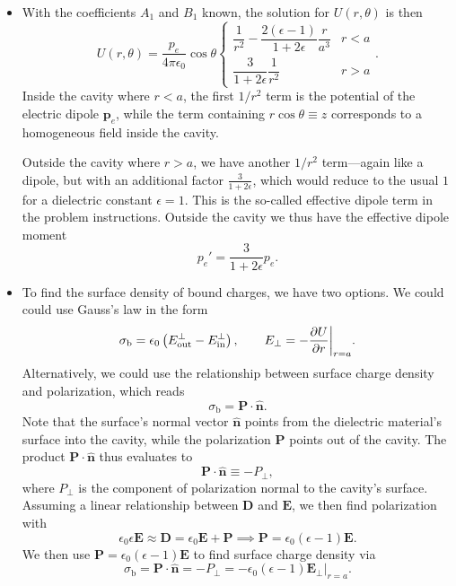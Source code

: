 \documentclass[11pt, a4paper]{article}
\renewcommand{\vec}[1]{\bm{#1}} %
\newcommand{\uvec}[1]{\hat{\vec{#1}}} %
\newcommand{\E}{\vec{E}}  %
\newcommand{\D}{\vec{D}}  %
\newcommand{\e}{\epsilon}
\newcommand{\ee}{\epsilon_{0}}  %
\newcommand{\pe}{\vec{p}_{e}}  %
\renewcommand{\P}{\vec{P}}  %
\begin{document}
\begin{itemize}
	\item With the coefficients $ A_{1} $ and $ B_{1} $ known, the solution for $ U(r, \theta) $ is then
	\begin{equation*}
		U(r, \theta) = \frac{p_{e}}{4\pi \ee}\cos \theta
		\begin{cases}
			\dfrac{1}{r^{2}} - \dfrac{2(\e - 1)}{1 + 2\e}\dfrac{r}{a^{3}} & r < a\\[2mm]
			\dfrac{3}{1 + 2\e} \dfrac{1}{r^{2}} & r > a
		\end{cases}.
	\end{equation*}
	Inside the cavity where $ r < a $, the first $ 1/r^{2} $ term is the potential of the electric dipole $ \pe $, while the term containing $  r \cos \theta \equiv z $ corresponds to a homogeneous field inside the cavity. 
	
	Outside the cavity where $ r > a $, we have another $ 1/r^{2} $ term---again like a dipole, but with an additional factor $ \frac{3}{1 + 2\e} $, which would reduce to the usual $ 1 $ for a dielectric constant $ \e = 1 $. This is the so-called effective dipole term in the problem instructions. Outside the cavity we thus have the effective dipole moment
	\begin{equation*}
		p_{e}' = \frac{3}{1 + 2\e}p_{e}.
	\end{equation*}
	
	\item To find the surface density of bound charges, we have two options. We could could use Gauss's law in the form
	\begin{equation*}
		\sigma_{\mathrm{b}} = \ee \left(E^{\mathrm{\perp}}_{\text{out}} - E^{\mathrm{\perp}}_{\text{in}}\right), \qquad E_{\perp} = -\pdv{U}{r} \bigg |_{r = a}.
	\end{equation*}
	Alternatively, we could use the relationship between surface charge density and polarization, which reads
	\begin{equation*}
		\sigma_{\mathrm{b}} = \P \cdot \uvec{n}.
	\end{equation*}
	Note that the surface's normal vector $ \uvec{n} $ points from the dielectric material's surface into the cavity, while the polarization $ \P $ points out of the cavity. The product $  \P \cdot \uvec{n} $ thus evaluates to
	\begin{equation*}
		 \P \cdot \uvec{n} \equiv - P_{\perp},
	\end{equation*}
	where $ P_{\perp} $ is the component of polarization normal to the cavity's surface. Assuming a linear relationship between $ \D $ and $ \E $, we then find polarization with
	\begin{equation*}
		\ee \e \E  \approx \D = \ee \E + \P \implies \P = \ee (\e - 1)\E.
	\end{equation*}
	We then use $ \P = \ee (\e - 1)\E $ to find surface charge density via
	\begin{equation*}
		\sigma_{\mathrm{b}} = \P \cdot \uvec{n} = -P_{\perp} = -\ee(\e - 1)\E_{\perp}\big |_{r = a}.
	\end{equation*}
\end{itemize}
\end{document}
